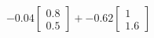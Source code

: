 \documentclass[preview]{standalone}
\begin{document}
\begin{align*}
-0.04 \begin{bmatrix} 0.8 \\ 0.5 \end{bmatrix} + -0.62 \begin{bmatrix} 1 \\ 1.6 \end{bmatrix}
\end{align*}
\end{document}
